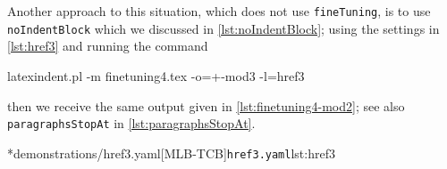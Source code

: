 \begin{example}
	 Another approach to this situation, which does not use \texttt{fineTuning}, is to use \texttt{noIndentBlock}
	 which we discussed in \vref{lst:noIndentBlock};
	 using the settings in \cref{lst:href3} and running the command
	 \begin{commandshell}
latexindent.pl -m finetuning4.tex -o=+-mod3 -l=href3
\end{commandshell}
	 then we receive the same output given in \cref{lst:finetuning4-mod2}; see also \texttt{paragraphsStopAt}
	 in \vref{lst:paragraphsStopAt}.

	 \cmhlistingsfromfile*[style=yaml-LST]*{demonstrations/href3.yaml}[MLB-TCB]{\texttt{href3.yaml}}{lst:href3}
 \end{example}
